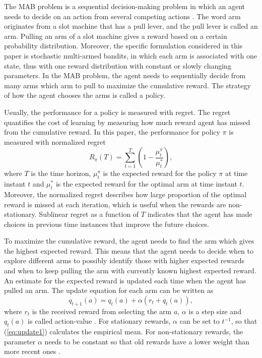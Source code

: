 \documentclass[conference]{IEEEtran}
\begin{document}
The MAB problem is a sequential decision-making problem in which an agent needs to decide on an action from several competing actions \cite{Sutton2018}.
The word arm originates from a slot machine that has a pull lever, and the pull lever is called an arm.
Pulling an arm of a slot machine gives a reward based on a certain probability distribution.
Moreover, the specific formulation considered in this paper is stochastic multi-armed bandits, in which each arm is associated with one state, thus with one reward distribution with constant or slowly changing parameters.
In the MAB problem, the agent needs to sequentially decide from many arms which arm to pull to maximize the cumulative reward.
The strategy of how the agent chooses the arms is called a policy.

Usually, the performance for a policy is measured with regret.
The regret quantifies the cost of learning by measuring how much reward agent has missed from the cumulative reward.
In this paper, the performance for policy $\pi$ is measured with normalized regret
\begin{equation}\label{eq:reg}
    R_\pi(T) = \sum_{t=1}^T \left( 1 - \frac{\mu^\pi_t}{\mu^*_t} \right),
\end{equation}
where $T$ is the time horizon, $\mu^\pi_t$ is the expected reward for the policy $\pi$ at time instant $t$ and $\mu_t^*$ is the expected reward for the optimal arm at time instant $t$.
Moreover, the normalized regret describes how large proportion of the optimal reward is missed at each iteration, which is useful when the rewards are non-stationary.
Sublinear regret as a function of $T$ indicates that the agent has made choices in previous time instances that improve the future choices.

To maximize the cumulative reward, the agent needs to find the arm which gives the highest expected reward.
This means that the agent needs to decide when to explore different arms to possibly identify those with higher expected rewards 
and when to keep pulling the arm with currently known highest expected reward.
An estimate for the expected reward is updated each time when the agent has pulled an arm.
The update equation for each arm can be written as
\begin{equation}\label{eq:update1}
    q_{t+1}(a) = q_{t}(a) + \alpha \left(r_t + q_{t}(a)\right),
\end{equation}
where $r_t$ is the received reward from selecting the arm $a$, $\alpha$ is a step size and $q_{t}(a)$ is called action-value \cite{Sutton2018}.
For stationary rewards, $\alpha$ can be set to $t^{-1}$, so that (\ref{eq:update1}) calculates the empirical mean. 
For non-stationary rewards, the parameter $\alpha$ needs to be constant so that old rewards have a lower weight than more recent ones \cite{Sutton2018}.
\end{document}
